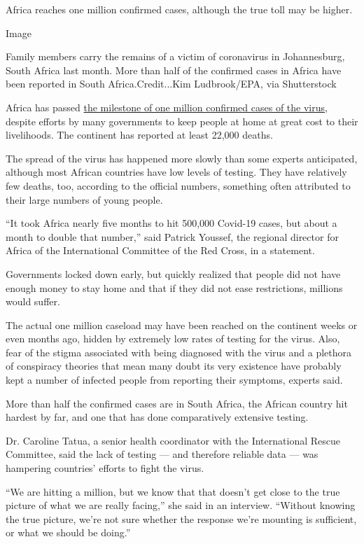 Africa reaches one million confirmed cases, although the true toll may
be higher.

Image

Family members carry the remains of a victim of coronavirus in
Johannesburg, South Africa last month. More than half of the confirmed
cases in Africa have been reported in South Africa.Credit...Kim
Ludbrook/EPA, via Shutterstock

Africa has passed \href{https://africacdc.org/covid-19/}{the milestone
of one million confirmed cases of the virus}, despite efforts by many
governments to keep people at home at great cost to their livelihoods.
The continent has reported at least 22,000 deaths.

The spread of the virus has happened more slowly than some experts
anticipated, although most African countries have low levels of testing.
They have relatively few deaths, too, according to the official numbers,
something often attributed to their large numbers of young people.

``It took Africa nearly five months to hit 500,000 Covid-19 cases, but
about a month to double that number,'' said Patrick Youssef, the
regional director for Africa of the International Committee of the Red
Cross, in a statement.

Governments locked down early, but quickly realized that people did not
have enough money to stay home and that if they did not ease
restrictions, millions would suffer.

The actual one million caseload may have been reached on the continent
weeks or even months ago, hidden by extremely low rates of testing for
the virus. Also, fear of the stigma associated with being diagnosed with
the virus and a plethora of conspiracy theories that mean many doubt its
very existence have probably kept a number of infected people from
reporting their symptoms, experts said.

More than half the confirmed cases are in South Africa, the African
country hit hardest by far, and one that has done comparatively
extensive testing.

Dr. Caroline Tatua, a senior health coordinator with the International
Rescue Committee, said the lack of testing --- and therefore reliable
data --- was hampering countries' efforts to fight the virus.

``We are hitting a million, but we know that that doesn't get close to
the true picture of what we are really facing,'' she said in an
interview. ``Without knowing the true picture, we're not sure whether
the response we're mounting is sufficient, or what we should be doing.''

